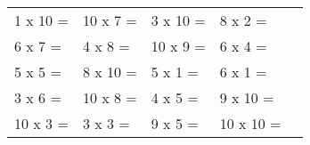 \documentclass{article}
\begin{document}
\begin{table}[ht] 
\begin{tabular}{ M{3cm} M{3.5cm} M{3,5cm} M{3.5cm} N }
1 x 10 =    & 10 x 7 =   & 3 x 10 =    &   8 x 2 =        &\\[1em] 
6 x 7 =    & 4 x 8 =   & 10 x 9 =    &   6 x 4 =        &\\[1em] 
5 x 5 =    & 8 x 10 =   & 5 x 1 =    &   6 x 1 =        &\\[1em] 
3 x 6 =    & 10 x 8 =   & 4 x 5 =    &   9 x 10 =        &\\[1em] 
10 x 3 =    & 3 x 3 =   & 9 x 5 =    &   10 x 10 =        &
\end{tabular}\end{table} 
\newpage
\end{document}
